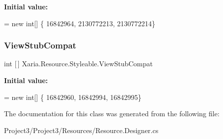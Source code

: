 {\bfseries Initial value\+:}
\begin{DoxyCode}
= \textcolor{keyword}{new} \textcolor{keywordtype}{int}[] \{
                    16842964,
                    2130772213,
                    2130772214\}
\end{DoxyCode}
\mbox{\label{classXaria_1_1Resource_1_1Styleable_a04123531ed2aae3d3cf03038508befcf}} 
\subsubsection{\texorpdfstring{View\+Stub\+Compat}{ViewStubCompat}}
{\footnotesize\ttfamily int \mbox{[}$\,$\mbox{]} Xaria.\+Resource.\+Styleable.\+View\+Stub\+Compat\hspace{0.3cm}{\ttfamily [static]}}

{\bfseries Initial value\+:}
\begin{DoxyCode}
= \textcolor{keyword}{new} \textcolor{keywordtype}{int}[] \{
                    16842960,
                    16842994,
                    16842995\}
\end{DoxyCode}


The documentation for this class was generated from the following file\+:\begin{DoxyCompactItemize}
\item 
Project3/\+Project3/\+Resources/Resource.\+Designer.\+cs\end{DoxyCompactItemize}

